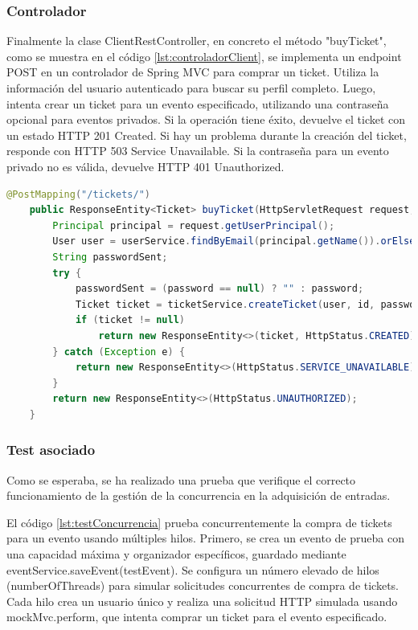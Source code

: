 \subsubsection{Controlador}
Finalmente la clase ClientRestController, en concreto el método "buyTicket", como se muestra en el código \ref{lst:controladorClient}, se implementa un endpoint POST en un controlador de Spring MVC
para comprar un ticket. Utiliza la información del usuario autenticado para buscar su perfil completo. Luego, intenta crear un ticket para un evento especificado, utilizando
una contraseña opcional para eventos privados. Si la operación tiene éxito, devuelve el ticket con un estado HTTP 201 Created. Si hay un problema durante la creación del
ticket, responde con HTTP 503 Service Unavailable. Si la contraseña para un evento privado no es válida, devuelve HTTP 401 Unauthorized.
\myjavastyle
\begin{lstlisting}[language=Java, caption=Función buyTicket, label=lst:controladorClient]
    @PostMapping("/tickets/")
    public ResponseEntity<Ticket> buyTicket(HttpServletRequest request, @RequestParam Long id, @RequestBody(required = false) String password) {
        Principal principal = request.getUserPrincipal();
        User user = userService.findByEmail(principal.getName()).orElseThrow();
        String passwordSent;
        try {
            passwordSent = (password == null) ? "" : password;
            Ticket ticket = ticketService.createTicket(user, id, passwordSent);
            if (ticket != null)
                return new ResponseEntity<>(ticket, HttpStatus.CREATED);
        } catch (Exception e) {
            return new ResponseEntity<>(HttpStatus.SERVICE_UNAVAILABLE);
        }
        return new ResponseEntity<>(HttpStatus.UNAUTHORIZED);
    }
\end{lstlisting}

\subsubsection{Test asociado}
Como se esperaba, se ha realizado una prueba que verifique el correcto funcionamiento de la gestión de la concurrencia en la adquisición de entradas. 

El código \ref{lst:testConcurrencia} prueba concurrentemente la compra de tickets para un evento usando múltiples hilos. Primero, se crea un evento de prueba con una capacidad máxima y organizador
específicos, guardado mediante eventService.saveEvent(testEvent). Se configura un número elevado de hilos (numberOfThreads) para simular solicitudes concurrentes de compra
de tickets. Cada hilo crea un usuario único y realiza una solicitud HTTP simulada usando mockMvc.perform, que intenta comprar un ticket para el evento especificado.

